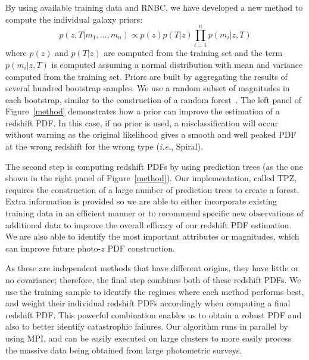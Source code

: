 By using available training data and RNBC, we have developed a new method to compute the individual galaxy priors:
\begin{equation}\label{prior}
 p(z,T|m_1,...,m_n) \propto p(z)p(T|z)\prod_{i=1}^{n} p(m_i|z,T)
\end{equation}
where $p(z)$ and $p(T|z)$ are computed from the training set and the term $p(m_i|z,T)$ is computed assuming a normal distribution with mean and variance computed from the training set. Priors are built by aggregating the results of several hundred bootstrap samples. We use a random subset of magnitudes in each bootstrap, similar to the construction of a random forest~\citep{Breiman2001}. The left panel of Figure~\ref{method}  demonstrates how a prior can improve the estimation of a redshift PDF. In this case, if no prior is used, a misclassification will occur without warning as the original likelihood gives a smooth and well peaked PDF at the wrong redshift for the wrong type (\textit{i.e.}, Spiral).

The second step is computing redshift PDFs by using prediction trees (as the one shown in the right panel of Figure~\ref{method}). Our implementation, called TPZ, requires the construction of a large number of prediction trees to create a forest. Extra information is provided so we are able to either incorporate existing training data in an efficient manner or to recommend specific new observations of additional data to improve the overall efficacy of our redshift PDF estimation. We are also able to identify the most important attributes or magnitudes, which can improve future photo-$z$ PDF construction.


As these are independent methods that have different origins, they have little or no covariance; therefore, the final step combines both of these redshift PDFs. We use the training sample to identify the regimes where each method performs best, and weight their individual redshift PDFs accordingly when computing a final redshift PDF. This powerful combination enables us to obtain a robust PDF and also to better identify catastrophic failures. Our algorithm runs in parallel by using MPI, and can be easily executed on large clusters to more easily process the massive data being obtained from large photometric surveys.

